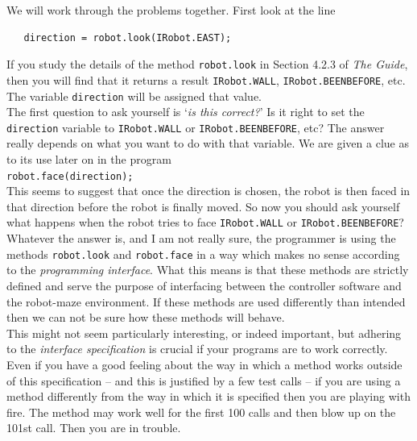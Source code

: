 \noindent
We will work through the problems together. First look at the line 

\begin{verbatim}
   direction = robot.look(IRobot.EAST);
\end{verbatim}

\noindent
If you study the details of the method {\tt robot.look} in Section 4.2.3
of {\it The Guide}, then you will find that it returns a result 
{\tt IRobot.WALL}, {\tt IRobot.BEENBEFORE}, etc. The variable 
{\tt direction} will be assigned that value. \\

\noindent
The first question to ask yourself is `{\it is this correct?}' Is it right 
to set the {\tt direction} variable to {\tt IRobot.WALL} or 
{\tt IRobot.BEENBEFORE}, etc? 
The answer really depends on what you want to do with that variable. We are 
given a clue as to its use later on in the program \\

{\tt robot.face(direction);} \\

\noindent
This seems to suggest that once the direction is chosen, the robot is then faced in that 
direction before the robot is finally moved. So now you should ask yourself
what happens when the robot tries to face {\tt IRobot.WALL} or 
{\tt IRobot.BEENBEFORE}? \\

\noindent
Whatever the answer is, and I am not really sure, the programmer is using the 
methods {\tt robot.look} and {\tt robot.face} in a way which makes no 
sense according to the {\it programming interface}. What this means is that 
these methods are strictly defined and serve the purpose of interfacing 
between the controller software and the robot-maze environment. If these 
methods are used differently than intended then we can not be sure how these
methods will behave. \\

\noindent
This might not seem particularly interesting, or indeed important, but 
adhering to the {\it interface specification} is crucial if your programs 
are to work correctly. Even if you have a good feeling about the way in 
which a method works outside of this specification -- and this is justified 
by a few test calls -- if you 
are using a method differently from the way in which it is specified then 
you are playing with fire. The method may work well for the first 100 calls
and then blow up on the 101st call. Then you are in trouble. \\

